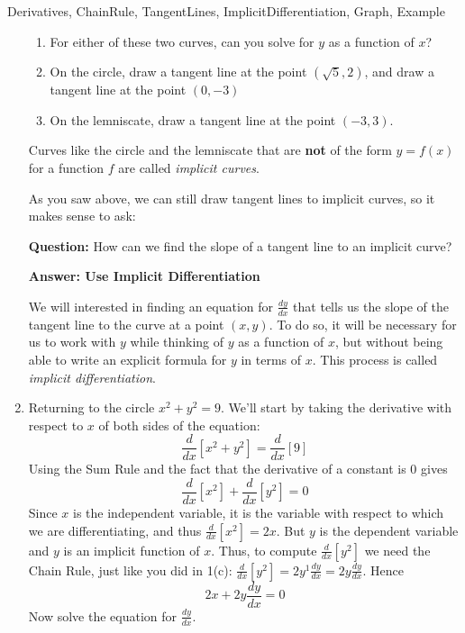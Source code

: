 \begin{tagblock}{Derivatives, ChainRule, TangentLines, ImplicitDifferentiation, Graph, Example}
\begin{question}
\begin{enumerate}
\begin{figure}[h]
\end{figure}
\begin{enumerate}
\item For either of these two curves, can you solve for $y$ as a function of $x$?
\vspace{.5in}

\item On the circle, draw a tangent line at the point $(\sqrt{5}, 2)$, and draw a tangent line at the point $(0,-3)$
\item On the lemniscate, draw a tangent line at the point $(-3,3)$.  
\end{enumerate}

\bigskip

Curves like the circle and the lemniscate that are \textbf{not} of the form $y=f(x)$ for a function $f$ are called \emph{implicit curves}.  

As you saw above, we can still draw tangent lines to implicit curves, so it makes sense to ask: 

\textbf{Question:} How can we find the slope of a tangent line to an implicit curve?  

\smallskip
\textbf{Answer:  Use Implicit Differentiation}  

We will  interested in finding an equation for $\frac{dy}{dx}$ that tells us the slope of the tangent line to the curve at a point $(x,y)$. To do so, it will be necessary for us to work with $y$ while thinking of $y$ as a function of $x$, but without being able to write an explicit formula for $y$ in terms of $x.$  This process is called \emph{implicit differentiation}.  

\newpage

\item Returning to the circle $x^2+y^2 = 9$.  We'll start by taking the derivative with respect to $x$ of both sides of the equation:
\[\frac{d}{dx} [x^2+y^2] = \frac{d}{dx}[9] \]
Using the Sum Rule and the fact that the derivative of a constant is $0$ gives
\[ \frac{d}{dx} [x^2]+\frac{d}{dx}[y^2] = 0\]
Since $x$ is the independent variable, it is the variable with respect to which we are differentiating, and thus $\frac{d}{dx} [x^2] = 2x$.  
But $y$ is the dependent variable and $y$ is an implicit function of $x$. Thus, to compute $\frac{d}{dx} [ y^2]$ we need the Chain Rule, just like you did in 1(c):  $\frac{d}{dx} [ y^2] = 2y^1 \frac{dy}{dx} = 2y \frac{dy}{dx}$.  Hence 
\[2x+2y \frac{dy}{dx} = 0 \]
Now solve the equation for $\frac{dy}{dx}$.
\vspace{1in}


\end{enumerate}
\end{question}
\end{tagblock}
